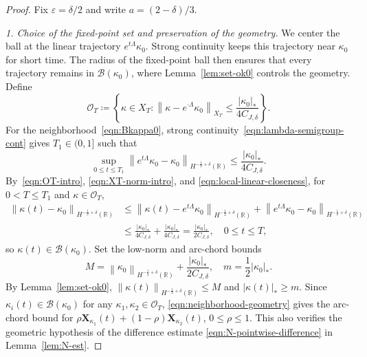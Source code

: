\documentclass[10pt,a4paper]{amsart}
\newcommand{\R}{\mathbb{R}}
\newcommand{\abs}[1]{\left\lvert #1 \right\rvert}
\newcommand{\bm}[1]{\boldsymbol{#1}}
\newcommand{\hr}[1]{H^{#1}(\R)}
\newcommand{\mc}[1]{\mathcal{#1}}
\newcommand{\norm}[1]{\left\lVert #1 \right\rVert}
\newcommand{\xka}[1]{\bm X_{\kappa_{#1}}}
\begin{document}
\begin{proof}
Fix $\varepsilon=\delta/2$ and write $a=(2-\delta)/3$.

\emph{1. Choice of the fixed-point set and preservation of the geometry.}
We center the ball at the linear trajectory $e^{t\Lambda}\kappa_0$.
Strong continuity keeps this trajectory near $\kappa_0$ for short time.
The radius of the fixed-point ball then ensures that every trajectory remains
in $\mc B(\kappa_0)$, where Lemma~\ref{lem:set-ok0} controls the geometry. Define
\begin{equation}\label{eqn:OT-intro}
    \mc O_T
    \coloneqq
    \left\{
    \kappa\in X_T:
    \norm{\kappa-e^{\cdot\Lambda}\kappa_0}_{X_T}
    \le \frac{\abs{\kappa_0}_*}{4C_{J,\delta}}
    \right\}.
\end{equation}
For the neighborhood~\eqref{eqn:Bkappa0}, strong
continuity~\eqref{eqn:lambda-semigroup-cont} gives $T_1\in(0,1]$ such that
\begin{equation}\label{eqn:local-linear-closeness}
    \sup_{0\le t\le T_1}
    \norm{e^{t\Lambda}\kappa_0-\kappa_0}_{\hr{-\frac12+\delta}}
    \le \frac{\abs{\kappa_0}_*}{4C_{J,\delta}}.
\end{equation}
By~\eqref{eqn:OT-intro}, \eqref{eqn:XT-norm-intro}, and
\eqref{eqn:local-linear-closeness}, for $0<T\le T_1$ and $\kappa\in\mc O_T$,
\begin{equation}
    \begin{aligned}
        \norm{\kappa(t)-\kappa_0}_{\hr{-\frac12+\delta}}
        &\le \norm{\kappa(t)-e^{t\Lambda}\kappa_0}_{\hr{-\frac12+\delta}}
        +\norm{e^{t\Lambda}\kappa_0-\kappa_0}_{\hr{-\frac12+\delta}}\\
        &\le \frac{\abs{\kappa_0}_*}{4C_{J,\delta}}
        +\frac{\abs{\kappa_0}_*}{4C_{J,\delta}}
        =\frac{\abs{\kappa_0}_*}{2C_{J,\delta}},
        \quad 0\le t\le T,
    \end{aligned}
\end{equation}
so $\kappa(t)\in\mc B(\kappa_0)$. Set the low-norm and arc-chord bounds
\begin{equation}
    M=\norm{\kappa_0}_{\hr{-\frac12+\delta}}
      +\frac{\abs{\kappa_0}_*}{2C_{J,\delta}},
    \quad
    m=\frac12\abs{\kappa_0}_*.
\end{equation}
By Lemma~\ref{lem:set-ok0},
$\norm{\kappa(t)}_{\hr{-\frac12+\delta}}\le M$ and
$\abs{\kappa(t)}_*\ge m$.
Since $\kappa_i(t)\in\mc B(\kappa_0)$ for any
$\kappa_1,\kappa_2\in\mc O_T$, \eqref{eqn:neighborhood-geometry} gives the arc-chord bound
for $\rho\xka{1}(t)+(1-\rho)\xka{2}(t)$, $0\le\rho\le1$.
This also verifies the geometric hypothesis of the difference estimate
\eqref{eqn:N-pointwise-difference} in Lemma~\ref{lem:N-est}.


\end{proof}
\end{document}
